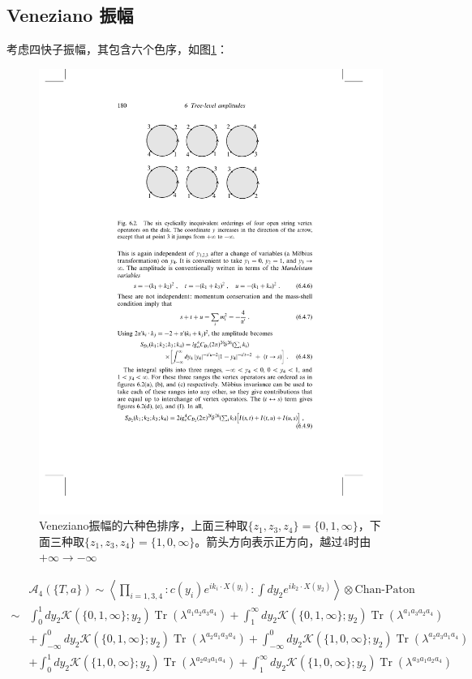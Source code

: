 \subsection{Veneziano 振幅}
考虑四快子振幅，其包含六个色序，如图\ref{fig:7}：
\begin{figure}[htbp]
	\centering
	\includegraphics{figs/fig7.pdf}
	\caption{Veneziano振幅的六种色排序，上面三种取$\{z_1,z_{3},z_4\}=\{0,1,\infty\}$，下面三种取$\{z_1,z_3,z_4\}=\{1,0,\infty\}$。箭头方向表示正方向，越过$4$时由$+\infty\to - \infty$}
	\label{fig:7}
\end{figure}
\begin{equation}
\begin{aligned}
		&\mathcal{A}_4(\{T,a\}) \sim \left\langle\prod_{i=1,3,4}: c(y_i)e^{ik_i\cdot X(y_i)}:\int dy_2 e^{ik_2\cdot X(y_2)}\right\rangle\otimes \text{Chan-Paton}\\
	\sim&\int_{0}^1dy_2\mathcal{K}(\{0,1,\infty\};y_2)\operatorname{Tr}\left(\lambda^{a_1a_2a_3a_4}\right)+\int_{1}^\infty dy_2\mathcal{K}(\{0,1,\infty\};y_2)\operatorname{Tr}\left(\lambda^{a_1a_3a_2a_4}\right)\\
	&+\int_{-\infty}^0dy_2\mathcal{K}(\{0,1,\infty\};y_2)\operatorname{Tr}\left(\lambda^{a_2a_1a_3a_4}\right)+\int_{-\infty}^0 dy_2\mathcal{K}(\{1,0,\infty\};y_2)\operatorname{Tr}\left(\lambda^{a_2a_3a_1a_4}\right)\\
	&+\int_{0}^1dy_2\mathcal{K}(\{1,0,\infty\};y_2)\operatorname{Tr}\left(\lambda^{a_2a_3a_1a_4}\right)+\int_{1}^\infty dy_2\mathcal{K}(\{1,0,\infty\};y_2)\operatorname{Tr}\left(\lambda^{a_3a_1a_2a_4}\right)\\
\end{aligned}
\end{equation}
